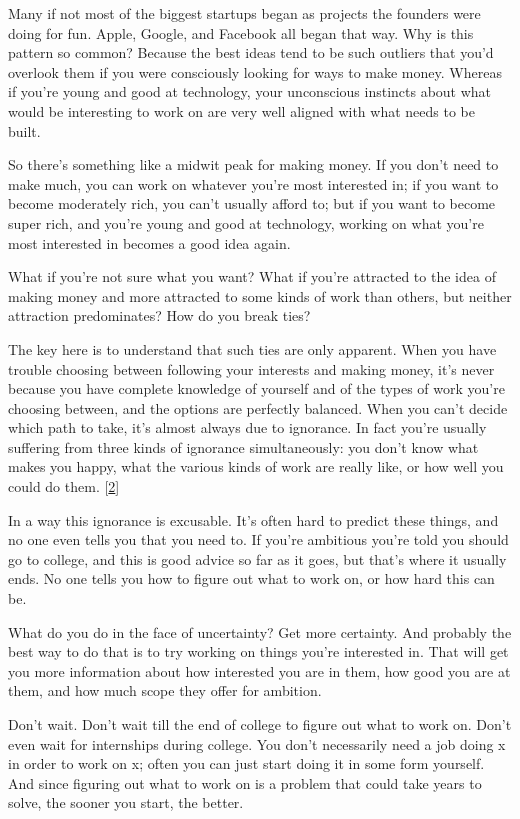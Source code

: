 Many if not most of the biggest startups began as projects the
founders were doing for fun. Apple, Google, and Facebook all began
that way. Why is this pattern so common? Because the best ideas
tend to be such outliers that you'd overlook them if you were
consciously looking for ways to make money. Whereas if you're young
and good at technology, your unconscious instincts about what would
be interesting to work on are very well aligned with what needs to
be built.

So there's something like a midwit peak for making money. If you
don't need to make much, you can work on whatever you're most
interested in; if you want to become moderately rich, you can't
usually afford to; but if you want to become super rich, and you're
young and good at technology, working on what you're most interested
in becomes a good idea again.

What if you're not sure what you want? What if you're attracted to
the idea of making money and more attracted to some kinds of work
than others, but neither attraction predominates? How do you break
ties?

The key here is to understand that such ties are only apparent.
When you have trouble choosing between following your interests and
making money, it's never because you have complete knowledge of
yourself and of the types of work you're choosing between, and the
options are perfectly balanced. When you can't decide which path
to take, it's almost always due to ignorance. In fact you're usually
suffering from three kinds of ignorance simultaneously: you don't
know what makes you happy, what the various kinds of work are really
like, or how well you could do them. 
[\href{\#f2n}{2}]

In a way this ignorance is excusable. It's often hard to predict
these things, and no one even tells you that you need to. If you're
ambitious you're told you should go to college, and this is good
advice so far as it goes, but that's where it usually ends. No one
tells you how to figure out what to work on, or how hard this can
be.

What do you do in the face of uncertainty? Get more certainty. And
probably the best way to do that is to try working on things you're
interested in. That will get you more information about how interested
you are in them, how good you are at them, and how much scope they
offer for ambition.

Don't wait. Don't wait till the end of college to figure out what
to work on. Don't even wait for internships during college. You
don't necessarily need a job doing x in order to work on x; often
you can just start doing it in some form yourself. And since figuring
out what to work on is a problem that could take years to solve,
the sooner you start, the better.

